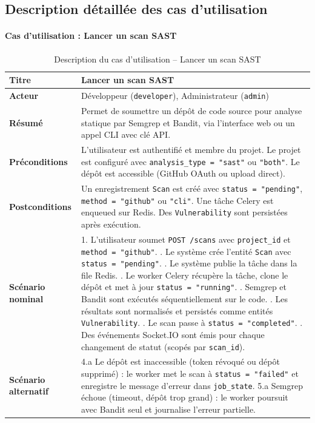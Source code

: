 \subsection{Description détaillée des cas d'utilisation}

\paragraph{Cas d'utilisation : Lancer un scan SAST}
\begin{table}[H]
\centering
\caption{Description du cas d'utilisation -- Lancer un scan SAST}
\label{tab:uc-sast}
\small
\renewcommand{\arraystretch}{1.3}
\begin{tabularx}{\textwidth}{>{\bfseries}p{3.5cm} X}
\hline
Titre & Lancer un scan SAST \\
\hline
Acteur & Développeur (\texttt{developer}), Administrateur (\texttt{admin}) \\
\hline
Résumé & Permet de soumettre un dépôt de code source pour analyse statique par Semgrep et Bandit, via l'interface web ou un appel CLI avec clé API. \\
\hline
Préconditions & L'utilisateur est authentifié et membre du projet. Le projet est configuré avec \texttt{analysis\_type = "sast"} ou \texttt{"both"}. Le dépôt est accessible (GitHub OAuth ou upload direct). \\
\hline
Postconditions & Un enregistrement \texttt{Scan} est créé avec \texttt{status = "pending"}, \texttt{method = "github"} ou \texttt{"cli"}. Une tâche Celery est enqueued sur Redis. Des \texttt{Vulnerability} sont persistées après exécution. \\
\hline
Scénario nominal &
1. L'utilisateur soumet \texttt{POST /scans} avec \texttt{project\_id} et \texttt{method = "github"}. \newline
2. Le système crée l'entité \texttt{Scan} avec \texttt{status = "pending"}. \newline
3. Le système publie la tâche dans la file Redis. \newline
4. Le worker Celery récupère la tâche, clone le dépôt et met à jour \texttt{status = "running"}. \newline
5. Semgrep et Bandit sont exécutés séquentiellement sur le code. \newline
6. Les résultats sont normalisés et persistés comme entités \texttt{Vulnerability}. \newline
7. Le scan passe à \texttt{status = "completed"}. \newline
8. Des événements Socket.IO sont émis pour chaque changement de statut (scopés par \texttt{scan\_id}). \\
\hline
Scénario alternatif &
4.a Le dépôt est inaccessible (token révoqué ou dépôt supprimé) : le worker met le scan à \texttt{status = "failed"} et enregistre le message d'erreur dans \texttt{job\_state}. \newline
5.a Semgrep échoue (timeout, dépôt trop grand) : le worker poursuit avec Bandit seul et journalise l'erreur partielle. \\
\hline
\end{tabularx}
\end{table}

